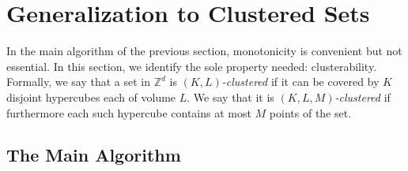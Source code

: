 \documentclass[11pt]{article}
\newcommand{\Z}{\mathbb{Z}}
\begin{document}
\section{Generalization to Clustered Sets}\label{sec:clustered}

In the main algorithm of the previous section, monotonicity is
convenient but not essential.
In this section, we identify the sole property needed: clusterability.  Formally, we say that
a set in $\Z^d$ is \emph{$(K,L)$-clustered} if it can be
covered by $K$ disjoint hypercubes each of volume $L$.
We say that it is \emph{$(K,L,M)$-clustered} if
furthermore each such hypercube contains at most $M$ points of the set.

\subsection{The Main Algorithm}
\end{document}
